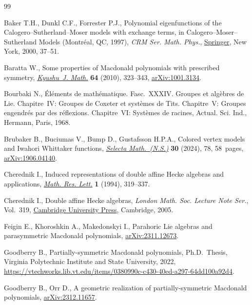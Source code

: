 \documentclass[10pt,a4paper]{amsart}
\theoremstyle{definition}
\numberwithin{equation}{section}
\begin{document}
\begin{thebibliography}{99}
\footnotesize\itemsep=0pt

Baker T.H., Dunkl C.F., Forrester P.J., Polynomial eigenfunctions of the
 {C}alogero--{S}utherland--{M}oser models with exchange terms, in
 Calogero--{M}oser--{S}utherland {M}odels ({M}ontr\'eal, {QC}, 1997), \textit{CRM Ser.
 Math. Phys.}, \href{https://doi.org/10.1007/978-1-4612-1206-5_3}{Springer}, New
 York, 2000, 37--51.

Baratta W., Some properties of {M}acdonald polynomials with prescribed
 symmetry, \href{https://doi.org/10.2206/kyushujm.64.323}{\textit{Kyushu~J.
 Math.}} \textbf{64} (2010), 323--343,
 \href{http://arxiv.org/abs/1001.3134}{arXiv:1001.3134}.

Bourbaki N., \'{E}l\'ements de math\'ematique. {F}asc.~{XXXIV}. {G}roupes et
 alg\`ebres de {L}ie. {C}hapitre~{IV}: {G}roupes de {C}oxeter et syst\`emes de
 {T}its. {C}hapitre~{V}: {G}roupes engendr\'es par des r\'eflexions.
 {C}hapitre~{VI}: {S}yst\`emes de racines, Actual. Sci. Ind., Hermann, Paris,
 1968.

Brubaker B., Buciumas V., Bump D., Gustafsson H.P.A., Colored vertex models and
 {I}wahori {W}hittaker functions,
 \href{https://doi.org/10.1007/s00029-024-00950-6}{\textit{Selecta
 Math.~(N.S.)}} \textbf{30} (2024), 78, 58~pages,
 \href{http://arxiv.org/abs/1906.04140}{arXiv:1906.04140}.

Cherednik I., Induced representations of double affine {H}ecke algebras and
 applications, \href{https://doi.org/10.4310/MRL.1994.v1.n3.a4}{\textit{Math.
 Res. Lett.}} \textbf{1} (1994), 319--337.

Cherednik I., Double affine {H}ecke algebras, \textit{London Math. Soc. Lecture
 Note Ser.}, Vol.~319,
 \href{https://doi.org/10.1017/CBO9780511546501}{Cambridge University Press},
 Cambridge, 2005.

Feigin E., Khoroshkin A., Makedonskyi I., Parahoric {L}ie algebras and
 parasymmetric {M}acdonald polynomials,
 \href{http://arxiv.org/abs/2311.12673}{arXiv:2311.12673}.

Goodberry B., Partially-symmetric {M}acdonald polynomials, Ph.D.~Thesis,
 {V}irginia Polytechnic Institute and State University, 2022,
 \url{https://vtechworks.lib.vt.edu/items/0380990c-c430-40ed-a297-64dd100a92d4}.

Goodberry B., Orr D., A geometric realization of partially-symmetric
 {M}acdonald polynomials,
 \href{http://arxiv.org/abs/2312.11657}{arXiv:2312.11657}.


\end{thebibliography}
\end{document}
